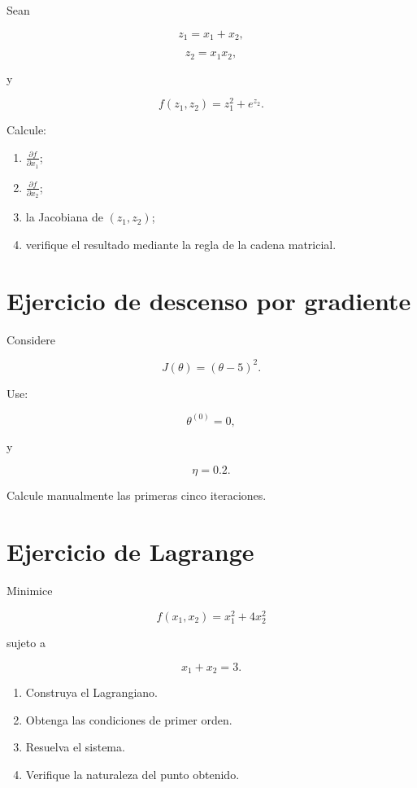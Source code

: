 \documentclass[
  spanish,
  10.5pt,
  letterpaper,
  DIV=11,
  numbers=noendperiod,
  oneside,
  open=any]{scrreprt}
\providecommand{\tightlist}{%
  \setlength{\itemsep}{0pt}\setlength{\parskip}{0pt}}
\theoremstyle{definition}
\theoremstyle{definition}
\theoremstyle{plain}
\theoremstyle{remark}
\begin{document}

Sean

\[
z_1=x_1+x_2,
\]

\[
z_2=x_1x_2,
\]

y

\[
f(z_1,z_2)
=
z_1^2+e^{z_2}.
\]

Calcule:

\begin{enumerate}
\def\labelenumi{\arabic{enumi}.}
\tightlist
\item
  \(\frac{\partial f}{\partial x_1}\);
\item
  \(\frac{\partial f}{\partial x_2}\);
\item
  la Jacobiana de \((z_1,z_2)\);
\item
  verifique el resultado mediante la regla de la cadena matricial.
\end{enumerate}

\section*{Ejercicio de descenso por
gradiente}\label{ejercicio-de-descenso-por-gradiente}


Considere

\[
J(\theta)
=
(\theta-5)^2.
\]

Use:

\[
\theta^{(0)}=0,
\]

y

\[
\eta=0.2.
\]

Calcule manualmente las primeras cinco iteraciones.

\section*{Ejercicio de Lagrange}\label{ejercicio-de-lagrange}


Minimice

\[
f(x_1,x_2)
=
x_1^2+4x_2^2
\]

sujeto a

\[
x_1+x_2=3.
\]

\begin{enumerate}
\def\labelenumi{\arabic{enumi}.}
\tightlist
\item
  Construya el Lagrangiano.
\item
  Obtenga las condiciones de primer orden.
\item
  Resuelva el sistema.
\item
  Verifique la naturaleza del punto obtenido.
\end{enumerate}
\end{document}
